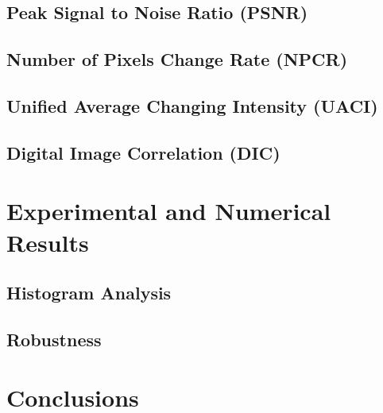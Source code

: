 \documentclass[UTF8]{book}
\begin{document}
    \section{Peak Signal to Noise Ratio (PSNR)}
    \section{Number of Pixels Change Rate (NPCR)}
    \newpage
    \section{Unified Average Changing Intensity (UACI)}
    \section{Digital Image Correlation (DIC)}
    \chapter{Experimental and Numerical Results}
    \section{Histogram Analysis}
    \newpage
    \section{Robustness}
    
    \setcounter{page}{13}
    \chapter{Conclusions}
    
    
    
    
    
\end{document}
